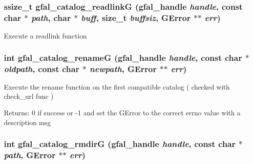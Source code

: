 \subsubsection{\setlength{\rightskip}{0pt plus 5cm}ssize\_\-t gfal\_\-catalog\_\-readlink\-G (gfal\_\-handle {\em handle}, const char $\ast$ {\em path}, char $\ast$ {\em buff}, size\_\-t {\em buffsiz}, GError $\ast$$\ast$ {\em err})}\label{gfal__common__catalog_8c_fae05f4bcf41d9b6b1063cf6210a81de}


Execute a readlink function 
\subsubsection{\setlength{\rightskip}{0pt plus 5cm}int gfal\_\-catalog\_\-rename\-G (gfal\_\-handle {\em handle}, const char $\ast$ {\em oldpath}, const char $\ast$ {\em newpath}, GError $\ast$$\ast$ {\em err})}\label{gfal__common__catalog_8c_99ffb13510951a6fe79f3c33305ea189}


Execute the rename function on the first compatible catalog ( checked with check\_\-url func ) \begin{Desc}
\item[Returns:]0 if success or -1 and set the GError to the correct errno value with a description msg \end{Desc}
\subsubsection{\setlength{\rightskip}{0pt plus 5cm}int gfal\_\-catalog\_\-rmdir\-G (gfal\_\-handle {\em handle}, const char $\ast$ {\em path}, GError $\ast$$\ast$ {\em err})}\label{gfal__common__catalog_8c_9cd4da87728df80003fe8618c4f63e13}


